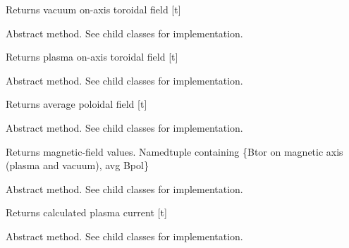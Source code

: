 \documentclass[letterpaper,10pt,english]{sphinxmanual}
\begin{document}
\begin{fulllineitems}
\begin{fulllineitems}
Returns vacuum on-axis toroidal field {[}t{]}

\end{fulllineitems}


\begin{fulllineitems}
\label{eqtools:eqtools.core.Equilibrium.getBtPla}
Abstract method.  See child classes for implementation.

Returns plasma on-axis toroidal field {[}t{]}

\end{fulllineitems}


\begin{fulllineitems}
\label{eqtools:eqtools.core.Equilibrium.getBpAvg}
Abstract method.  See child classes for implementation.

Returns average poloidal field {[}t{]}

\end{fulllineitems}


\begin{fulllineitems}
\label{eqtools:eqtools.core.Equilibrium.getFields}
Abstract method.  See child classes for implementation.

Returns magnetic-field values.
Namedtuple containing \{Btor on magnetic axis (plasma and vacuum), avg Bpol\}

\end{fulllineitems}


\begin{fulllineitems}
\label{eqtools:eqtools.core.Equilibrium.getIpCalc}
Abstract method.  See child classes for implementation.

Returns calculated plasma current {[}t{]}

\end{fulllineitems}


\begin{fulllineitems}
\label{eqtools:eqtools.core.Equilibrium.getIpMeas}
Abstract method.  See child classes for implementation.


\end{fulllineitems}
\end{fulllineitems}
\end{document}
